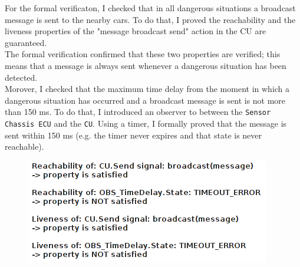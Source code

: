 \documentclass{article}
\begin{document}
For the formal verificaton, I checked that in all dangerous situations a broadcast message is sent to the nearby cars. To do that, I proved the reachability and the liveness properties of the "message broadcast send" action in the CU are guaranteed. \\

The formal verification confirmed that these two properties are verified; this means that a message is always sent whenever a dangerous situation has been detected. \\

Morover, I checked that the maximum time delay from the moment in which a dangerous situation has occurred and a broadcast message is sent is not more than 150 ms. To do that, I introduced an observer to between the \texttt{Sensor Chassis ECU} and the \texttt{CU}. Using a timer, I formally proved that the message is sent within 150 ms (e.g. the timer never expires and that state is never reachable).\\

\begin{figure}[h!]
  \centering
  \includegraphics[width = \textwidth]{./formal.png}
\end{figure}
\end{document}
